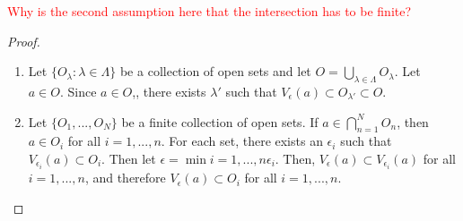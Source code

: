 \documentclass{ximera}
\begin{document}
\textcolor{red}{Why is the second assumption here that the intersection has to be finite?}

\begin{proof}
\begin{enumerate}
   \item  Let $\{O_\lambda:\lambda \in \Lambda\}$ be a collection of open sets and let $O = \bigcup\limits_{\lambda\in \Lambda} O_\lambda$. Let $a \in O.$  Since $a \in O$,, there exists $\lambda'$ such that $V_\epsilon(a) \subset O_{\lambda'}\subset O$.
\item Let $\{O_1, ..., O_N\}$ be a finite collection of open sets.  If $a \in \bigcap\limits_{n=1}^N O_n$, then $a \in O_i$ for all $i = 1,..., n$.  For each set, there exists an $\epsilon_i$ such that $V_{\epsilon_i}(a) \subset O_i$. 
Then let $\epsilon = \min{i=1,..., n} \epsilon_i$.  Then, $V_\epsilon(a) \subset V_{\epsilon_i}(a)$ for all $i =1,...,n$, and therefore $V_\epsilon(a) \subset O_i$ for all $i=1,..., n$.
\end{enumerate}
\end{proof}
\end{document}
